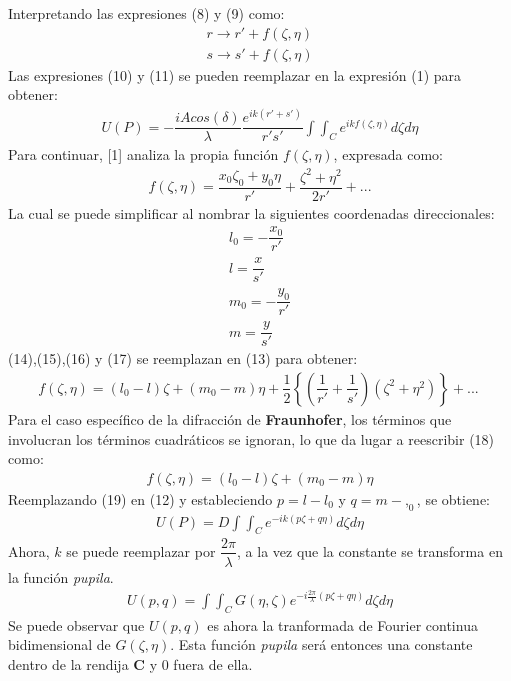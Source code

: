 \documentclass{article}
\begin{document}
Interpretando las expresiones (8)  y (9) como:
\begin{eqnarray}
r \rightarrow r\prime + f(\zeta,\eta)\\
s \rightarrow s\prime + f(\zeta,\eta) 
\end{eqnarray}
Las expresiones (10) y (11) se pueden reemplazar en la expresión (1) para obtener:
\begin{eqnarray}
U(P)=-\dfrac{iAcos(\delta)}{\lambda}\dfrac{e^{ik(r\prime + s\prime)}}{r\prime s\prime}\int \int_C e^{ikf(\zeta,\eta)}d\zeta d\eta
\end{eqnarray}
Para continuar, [1] analiza la propia función $f(\zeta,\eta)$, expresada como:
\begin{eqnarray}
f(\zeta,\eta)= \dfrac{x_0\zeta_0 + y_0\eta}{r\prime} + \dfrac{\zeta^2 + \eta^2}{2r\prime}+...
\end{eqnarray}
La cual se puede simplificar al nombrar la siguientes coordenadas direccionales:
\begin{eqnarray}
l_0 = -\dfrac{x_0}{r\prime}\\
l=\dfrac{x}{s\prime}\\
m_0=-\dfrac{y_0}{r\prime}\\
m = \dfrac{y}{s\prime}
\end{eqnarray}
(14),(15),(16) y (17) se reemplazan en (13) para obtener:
\begin{eqnarray}
f(\zeta,\eta)=(l_0 - l)\zeta + (m_0-m)\eta + \dfrac{1}{2}\left\lbrace \left( \dfrac{1}{r\prime} + \dfrac{1}{s\prime}\right)(\zeta^2 + \eta^2)\right\rbrace + ...\ 
\end{eqnarray}
Para el caso específico de la difracción de \textbf{Fraunhofer}, los términos que involucran los términos cuadráticos se ignoran, lo que da lugar a reescribir (18) como:
\begin{eqnarray}
f(\zeta,\eta) = (l_0 - l)\zeta + (m_0-m)\eta
\end{eqnarray}
Reemplazando (19) en (12) y estableciendo $p=l-l_0$ y  $q=m-,_0$, se obtiene:
\begin{eqnarray}
U(P)=D\int \int_C e^{-ik(p\zeta + q\eta)}d\zeta d\eta
\end{eqnarray}
Ahora, $k$ se puede reemplazar por $\dfrac{2\pi}{\lambda}$, a la vez que la constante se transforma en la función \textit{pupila}.
\begin{eqnarray}
U(p,q)=\int \int_C G(\eta,\zeta) e^{-i\frac{2\pi}{\lambda}(p\zeta + q\eta)}d\zeta d\eta
\end{eqnarray}
Se puede observar que $U(p,q)$ es ahora la tranformada de Fourier continua bidimensional de $G(\zeta,\eta)$. Esta función \textit{pupila} será entonces una constante dentro de la rendija \textbf{C} y 0 fuera de ella.
\end{document}
